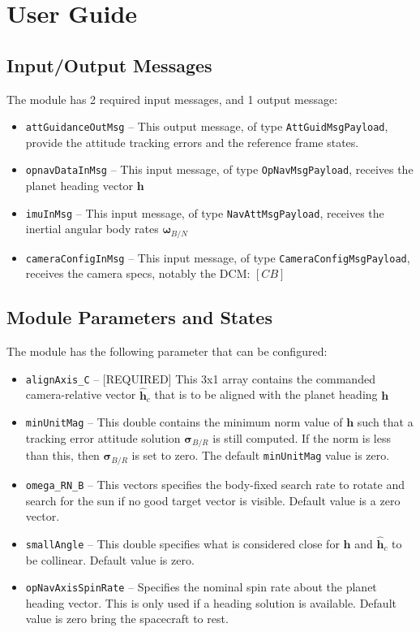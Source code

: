 
\section{User Guide}
\subsection{Input/Output Messages}
The module has 2 required input messages, and 1 output message:
\begin{itemize}
	\item {\tt attGuidanceOutMsg} -- This output message, of type {\tt AttGuidMsgPayload}, provide the attitude tracking errors and the reference frame states.
	\item {\tt opnavDataInMsg} -- This input message, of type {\tt OpNavMsgPayload}, receives the planet heading vector $\bm h$
	\item {\tt imuInMsg} -- This input message, of type {\tt NavAttMsgPayload}, receives the inertial angular body rates $\bm \omega_{B/N}$
	\item {\tt cameraConfigInMsg} -- This input message, of type {\tt CameraConfigMsgPayload}, receives the camera specs, notably the DCM: $[CB]$
\end{itemize}

\subsection{Module Parameters and States}
The module has the following parameter that can be configured:
\begin{itemize}
	\item {\tt alignAxis\_C} -- [REQUIRED] This 3x1 array contains the commanded camera-relative vector $\hat{\bm h}_{c}$ that is to be aligned with the planet heading $\bm h$
	
	\item {\tt minUnitMag} -- This double contains the minimum norm value of $\bm h$ such that a tracking error attitude solution $\bm\sigma_{B/R}$ is still computed.  If the norm is less than this, then $\bm\sigma_{B/R}$ is set to zero.  The default {\tt minUnitMag} value is zero. 
	
	\item {\tt omega\_RN\_B} -- This vectors specifies the body-fixed search rate to rotate and search for the sun if no good target vector is visible.  Default value is a zero vector.  

	\item {\tt smallAngle} -- This double specifies what is considered close for $\bm h$ and $\hat{\bm h}_{c}$ to be collinear.  Default value is zero.  
	
	\item {\tt opNavAxisSpinRate} -- Specifies the nominal spin rate about the planet heading vector.  This is only used if a heading solution is available.  Default value is zero bring the spacecraft to rest. 
	
\end{itemize}

